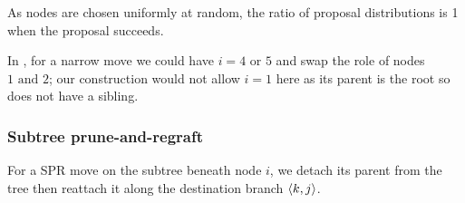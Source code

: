 \documentclass[11pt,a4paper]{article}
\begin{document}
As nodes are chosen uniformly at random, the ratio of proposal distributions is 1 when the proposal succeeds.

In , for a narrow move we could have $ i = 4 \text{ or } 5 $ and swap the role of nodes $ 1 \text{ and } 2 $; our construction would not allow $ i = 1 $ here as its parent is the root so does not have a sibling.

\subsubsection{Subtree prune-and-regraft}

For a SPR move on the subtree beneath node $ i $, we detach its parent from the tree then reattach it along the destination branch $ \langle k, j\rangle $.

\end{document}
